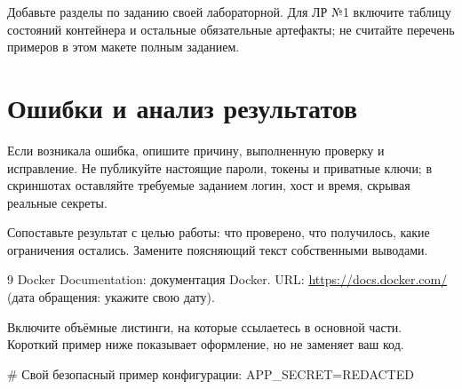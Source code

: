 
Добавьте разделы по заданию своей лабораторной. Для ЛР №1 включите
таблицу состояний контейнера и остальные обязательные артефакты;
не считайте перечень примеров в этом макете полным заданием.

\section{Ошибки и анализ результатов}

Если возникала ошибка, опишите причину, выполненную проверку и исправление.
Не публикуйте настоящие пароли, токены и приватные ключи; в скриншотах
оставляйте требуемые заданием логин, хост и время, скрывая реальные секреты.


Сопоставьте результат с целью работы: что проверено, что получилось,
какие ограничения остались. Замените поясняющий текст собственными выводами.

\begin{thebibliography}{9}
  Docker Documentation: документация Docker.
  URL: \url{https://docs.docker.com/}
  (дата обращения: укажите свою дату).
\end{thebibliography}

\startreportappendices
{}

Включите объёмные листинги, на которые ссылаетесь в основной части.
Короткий пример ниже показывает оформление, но не заменяет ваш код.

\begin{code}
# Свой безопасный пример конфигурации:
APP_SECRET=REDACTED
\end{code}
